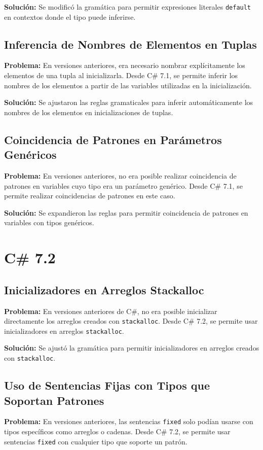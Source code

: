 \textbf{Solución:} Se modificó la gramática para permitir expresiones literales \texttt{default} en contextos donde el tipo puede inferirse.

\subsection{Inferencia de Nombres de Elementos en Tuplas}
\textbf{Problema:} En versiones anteriores, era necesario nombrar explícitamente los elementos de una tupla al inicializarla. Desde C\# 7.1, se permite inferir los nombres de los elementos a partir de las variables utilizadas en la inicialización.

\textbf{Solución:} Se ajustaron las reglas gramaticales para inferir automáticamente los nombres de los elementos en inicializaciones de tuplas.

\subsection{Coincidencia de Patrones en Parámetros Genéricos}
\textbf{Problema:} En versiones anteriores, no era posible realizar coincidencia de patrones en variables cuyo tipo era un parámetro genérico. Desde C\# 7.1, se permite realizar coincidencias de patrones en este caso.

\textbf{Solución:} Se expandieron las reglas para permitir coincidencia de patrones en variables con tipos genéricos.


\section{C\# 7.2}

\subsection{Inicializadores en Arreglos Stackalloc}
\textbf{Problema:} En versiones anteriores de C\#, no era posible inicializar directamente los arreglos creados con \texttt{stackalloc}. Desde C\# 7.2, se permite usar inicializadores en arreglos \texttt{stackalloc}.

\textbf{Solución:} Se ajustó la gramática para permitir inicializadores en arreglos creados con \texttt{stackalloc}.

\subsection{Uso de Sentencias Fijas con Tipos que Soportan Patrones}
\textbf{Problema:} En versiones anteriores, las sentencias \texttt{fixed} solo podían usarse con tipos específicos como arreglos o cadenas. Desde C\# 7.2, se permite usar sentencias \texttt{fixed} con cualquier tipo que soporte un patrón.

